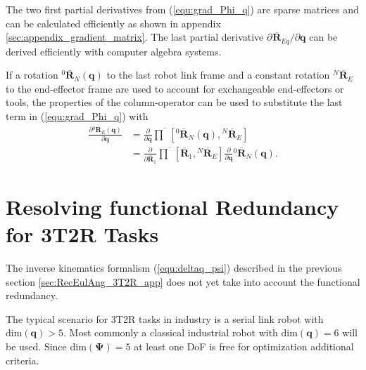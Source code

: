 \documentclass[twocolumn,10pt]{IFTOMM}
\newcommand{\bm}[1]{\boldsymbol{#1}}
\newcommand{\rotmato}[2]{{{ }^{#1}\boldsymbol{\overline{R}}}_{#2}}
\begin{document}
The two first partial derivatives from (\ref{equ:grad_Phi_q}) are sparse matrices and can be calculated efficiently as shown in appendix \ref{sec:appendix_gradient_matrix}.
The last partial derivative $\partial \rotmato{}{Eq}/\partial \bm{q}$ can be derived efficiently with computer algebra systems.

If a rotation $\rotmato{0}{N}(\bm{q})$ to the last robot link frame and a constant rotation $\rotmato{N}{E}$ to the end-effector frame are used to account for exchangeable end-effectors or tools, the properties of the column-operator can be used to substitute the last term in (\ref{equ:grad_Phi_q}) with
%
\begin{align}
\frac{\partial \rotmato{0}{E}(\bm{q})}{\partial \bm{q}} 
&=
\frac{\partial}{\partial \bm{q}} \overline{\prod}\left[ \rotmato{0}{N}(\bm{q}), \rotmato{N}{E}\right] \nonumber \\
&=
\frac{\partial}{\partial \overline{\bm{R}}_1} \overline{\prod}\left[ \overline{\bm{R}}_1, \rotmato{N}{E}\right]
\frac{\partial}{\partial \bm{q}} \rotmato{0}{N}(\bm{q}).
\label{equ:ee_rotation_gradq}
\end{align}

\section{Resolving functional Redundancy for 3T2R Tasks}
\label{sec:ResFuncRed}


The inverse kinematics formalism (\ref{equ:deltaq_psi}) described in the previous section \ref{sec:RecEulAng_3T2R_app} does not yet take into account the functional redundancy.

The typical scenario for 3T2R tasks in industry is a serial link robot with $\mathrm{dim}(\bm{q})>5$.
Most commonly a classical industrial robot with $\mathrm{dim}(\bm{q})=6$ will be used.
Since $\mathrm{dim}(\bm{\Psi})=5$ at least one DoF is free for optimization additional criteria.
\end{document}
